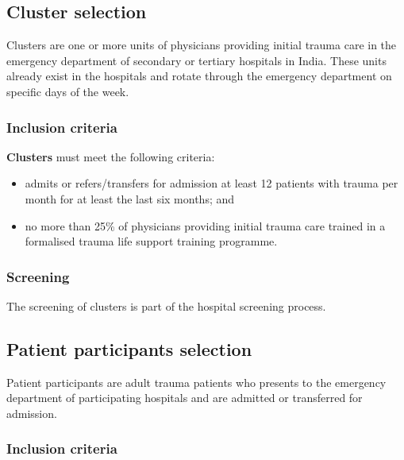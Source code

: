 \documentclass[
]{scrartcl}
\providecommand{\tightlist}{%
  \setlength{\itemsep}{0pt}\setlength{\parskip}{0pt}}\usepackage{longtable,booktabs,array}
\begin{document}
\hypertarget{cluster-selection}{%
\subsection{Cluster selection}\label{cluster-selection}}

Clusters are one or more units of physicians providing initial trauma
care in the emergency department of secondary or tertiary hospitals in
India. These units already exist in the hospitals and rotate through the
emergency department on specific days of the week.

\hypertarget{inclusion-criteria}{%
\subsubsection{Inclusion criteria}\label{inclusion-criteria}}

\textbf{Clusters} must meet the following criteria:

\begin{itemize}
\tightlist
\item
  admits or refers/transfers for admission at least 12 patients with
  trauma per month for at least the last six months; and
\item
  no more than 25\% of physicians providing initial trauma care trained
  in a formalised trauma life support training programme.
\end{itemize}

\hypertarget{screening-1}{%
\subsubsection{Screening}\label{screening-1}}

The screening of clusters is part of the hospital screening process.

\hypertarget{patient-participants-selection}{%
\subsection{Patient participants
selection}\label{patient-participants-selection}}

Patient participants are adult trauma patients who presents to the
emergency department of participating hospitals and are admitted or
transferred for admission.

\hypertarget{inclusion-criteria-1}{%
\subsubsection{Inclusion criteria}\label{inclusion-criteria-1}}
\end{document}
